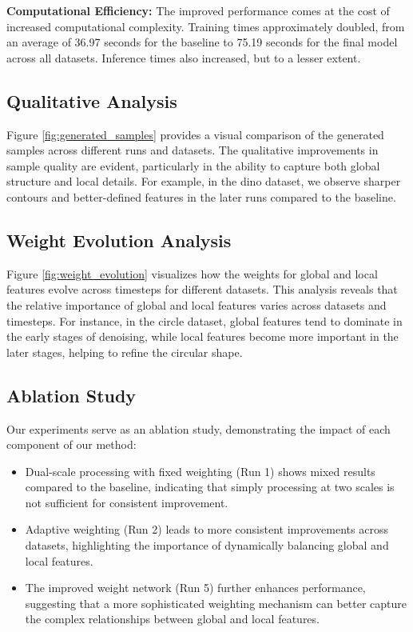 \documentclass{article} %
\begin{document}
\textbf{Computational Efficiency:} The improved performance comes at the cost of increased computational complexity. Training times approximately doubled, from an average of 36.97 seconds for the baseline to 75.19 seconds for the final model across all datasets. Inference times also increased, but to a lesser extent.

\subsection{Qualitative Analysis}

Figure \ref{fig:generated_samples} provides a visual comparison of the generated samples across different runs and datasets. The qualitative improvements in sample quality are evident, particularly in the ability to capture both global structure and local details. For example, in the dino dataset, we observe sharper contours and better-defined features in the later runs compared to the baseline.

\subsection{Weight Evolution Analysis}

Figure \ref{fig:weight_evolution} visualizes how the weights for global and local features evolve across timesteps for different datasets. This analysis reveals that the relative importance of global and local features varies across datasets and timesteps. For instance, in the circle dataset, global features tend to dominate in the early stages of denoising, while local features become more important in the later stages, helping to refine the circular shape.

\subsection{Ablation Study}

Our experiments serve as an ablation study, demonstrating the impact of each component of our method:

\begin{itemize}
    \item Dual-scale processing with fixed weighting (Run 1) shows mixed results compared to the baseline, indicating that simply processing at two scales is not sufficient for consistent improvement.
    \item Adaptive weighting (Run 2) leads to more consistent improvements across datasets, highlighting the importance of dynamically balancing global and local features.
    \item The improved weight network (Run 5) further enhances performance, suggesting that a more sophisticated weighting mechanism can better capture the complex relationships between global and local features.
\end{itemize}
\end{document}
